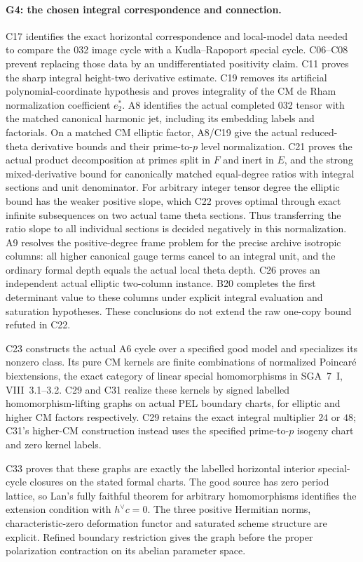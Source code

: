 \paragraph{G4: the chosen integral correspondence and connection.}
C17 identifies the exact horizontal correspondence and local-model
data needed to compare the 032 image cycle with a Kudla--Rapoport
special cycle. C06--C08 prevent replacing those data by an
undifferentiated positivity claim. C11 proves the sharp integral
height-two derivative estimate. C19 removes its artificial
polynomial-coordinate hypothesis and proves integrality of the
CM de Rham normalization coefficient $e_2^*$.
A8 identifies the actual completed 032 tensor with the matched
canonical harmonic jet, including its embedding labels and
factorials. On a matched CM elliptic factor, A8/C19 give the
actual reduced-theta derivative bounds and their prime-to-$p$
level normalization. C21 proves the actual product decomposition
at primes split in $F$ and inert in $E$, and the strong
mixed-derivative bound for canonically matched equal-degree
ratios with integral sections and unit denominator.
For arbitrary integer tensor degree the elliptic bound has
the weaker positive slope, which C22 proves optimal through
exact infinite subsequences on two actual tame theta sections.
Thus transferring the ratio slope to all individual sections
is decided negatively in this normalization.
A9 resolves the positive-degree frame problem for the precise
archive isotropic columns: all higher canonical gauge terms
cancel to an integral unit, and the ordinary formal depth
equals the actual local theta depth. C26 proves an independent
actual elliptic two-column instance. B20 completes the first
determinant value to these columns under explicit integral
evaluation and saturation hypotheses. These conclusions do
not extend the raw one-copy bound refuted in C22.

C23 constructs the actual A6 cycle over a specified good model
and specializes its nonzero class. Its pure CM kernels are
finite combinations of normalized Poincar\'e biextensions,
the exact category of linear special homomorphisms in SGA~7~I,
VIII~3.1--3.2. C29 and C31 realize these kernels by signed
labelled homomorphism-lifting graphs on actual PEL boundary
charts, for elliptic and higher CM factors respectively.
C29 retains the exact integral multiplier $24$ or $48$;
C31's higher-CM construction instead uses the specified
prime-to-$p$ isogeny chart and zero kernel labels.

C33 proves that these graphs are exactly the labelled horizontal
interior special-cycle closures on the stated formal charts.
The good source has zero period lattice, so Lan's fully faithful
theorem for arbitrary homomorphisms identifies the extension
condition with $h^\vee c=0$. The three positive Hermitian norms,
characteristic-zero deformation functor and saturated scheme
structure are explicit. Refined boundary restriction gives the
graph before the proper polarization contraction on its
abelian parameter space.

